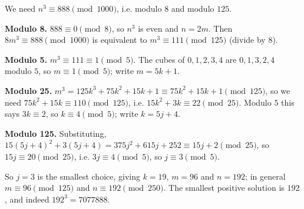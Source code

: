 We need $n^3\equiv888\pmod{1000}$, i.e. modulo $8$ and modulo $125$.

\textbf{Modulo 8.} $888\equiv0\pmod8$, so $n^3$ is even and $n=2m$. Then $8m^3\equiv888\pmod{1000}$ is equivalent to $m^3\equiv111\pmod{125}$ (divide by $8$).

\textbf{Modulo 5.} $m^3\equiv111\equiv1\pmod5$. The cubes of $0,1,2,3,4$ are $0,1,3,2,4$ modulo $5$, so $m\equiv1\pmod5$; write $m=5k+1$.

\textbf{Modulo 25.} $m^3=125k^3+75k^2+15k+1\equiv75k^2+15k+1\pmod{125}$, so we need $75k^2+15k\equiv110\pmod{125}$, i.e. $15k^2+3k\equiv22\pmod{25}$. Modulo $5$ this says $3k\equiv2$, so $k\equiv4\pmod5$; write $k=5j+4$.

\textbf{Modulo 125.} Substituting, $15(5j+4)^2+3(5j+4)=375j^2+615j+252\equiv15j+2\pmod{25}$, so $15j\equiv20\pmod{25}$, i.e. $3j\equiv4\pmod5$, so $j\equiv3\pmod5$.

So $j=3$ is the smallest choice, giving $k=19$, $m=96$ and $n=192$; in general $m\equiv96\pmod{125}$ and $n\equiv192\pmod{250}$. The smallest positive solution is $\boxed{192}$, and indeed $192^3=7077888$.

